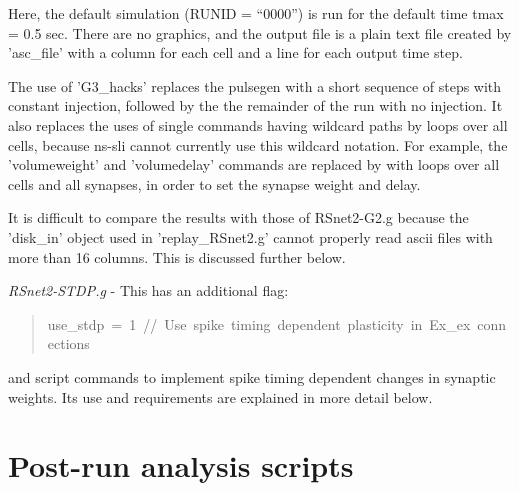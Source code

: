 \documentclass[10pt,a4paper,english]{article}
\begin{document}
Here, the default simulation (RUNID = ``0000'') is run for the default
time tmax = 0.5 sec.  There are no graphics, and the output file is
a plain text file created by 'asc{\_}file' with a column for each cell
and a line for each output time step.

The use of 'G3{\_}hacks' replaces the pulsegen with a short sequence of steps
with constant injection, followed by the the remainder of the run with no
injection.  It also replaces the uses of single commands having wildcard
paths by loops over all cells, because ns-sli cannot currently use this
wildcard notation.  For example, the 'volumeweight' and 'volumedelay'
commands are replaced by with loops over all cells and all synapses, in
order to set the synapse weight and delay.

It is difficult to compare the results with those of RSnet2-G2.g because
the 'disk{\_}in' object used in 'replay{\_}RSnet2.g' cannot properly read
ascii files with more than 16 columns.  This is discussed further below.

\emph{RSnet2-STDP.g} - This has an additional flag:
\begin{quote}{\ttfamily \raggedright \noindent
use{\_}stdp~=~1~//~Use~spike~timing~dependent~plasticity~in~Ex{\_}ex~connections
}\end{quote}

and script commands to implement spike timing dependent changes in synaptic
weights.  Its use and requirements are explained in more detail below.



\hypertarget{post-run-analysis-scripts}{}
\section*{Post-run analysis scripts}
\label{post-run-analysis-scripts}
\end{document}
